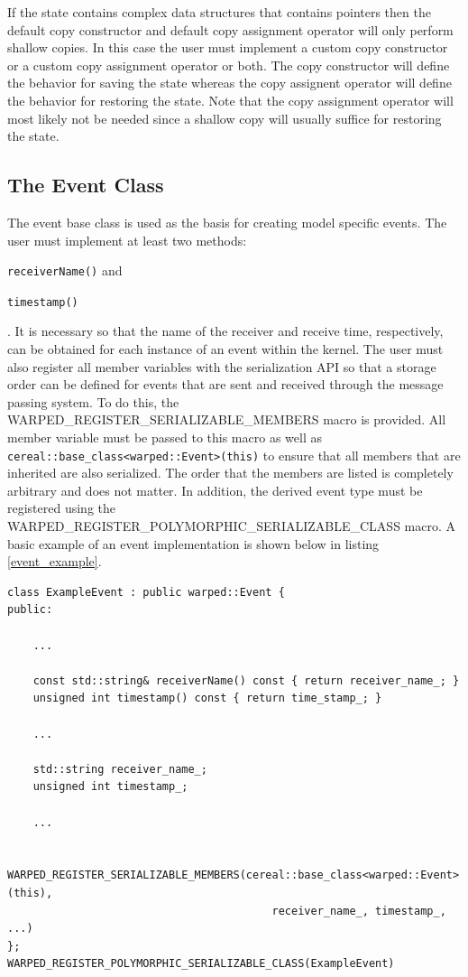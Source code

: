 \documentclass[11pt]{book}
\begin{document}
If the state contains complex data structures that contains pointers then the default copy
constructor and default copy assignment operator will only perform shallow copies. In this
case the user must implement a custom copy constructor or a custom copy assignment operator
or both. The copy constructor will define the behavior for saving the state whereas the
copy assignent operator will define the behavior for restoring the state. Note that the
copy assignment operator will most likely not be needed since a shallow copy will usually
suffice for restoring the state.

\subsection{The Event Class}

The event base class is used as the basis for creating model specific events. The user must
implement at least two methods: \begin{inparaenum}[(1)] \item \texttt{receiverName()} and 
\item \texttt{timestamp()} \end{inparaenum}. It is necessary so that the name of the receiver
and receive time, respectively, can be obtained for each instance of an event within the kernel.
The user must also register all member variables with the serialization API so that a storage
order can be defined for events that are sent and received through the message passing system.
To do this, the WARPED\_REGISTER\_SERIALIZABLE\_MEMBERS macro is provided. All member variable
must be passed to this macro as well as \texttt{cereal::base\_class<warped::Event>(this)} to
ensure that all members that are inherited are also serialized. The order that the members are
listed is completely arbitrary and does not matter. In addition, the derived event type must
be registered using the WARPED\_REGISTER\_POLYMORPHIC\_SERIALIZABLE\_CLASS macro. A basic
example of an event implementation is shown below in listing \ref{event_example}.

\begin{lstlisting}[caption=Sample \textsc{warped2} Event Definition, label=event_example, float]
class ExampleEvent : public warped::Event {
public:

    ...

    const std::string& receiverName() const { return receiver_name_; }
    unsigned int timestamp() const { return time_stamp_; }

    ...

    std::string receiver_name_;
    unsigned int timestamp_;

    ...

    WARPED_REGISTER_SERIALIZABLE_MEMBERS(cereal::base_class<warped::Event>(this),
                                         receiver_name_, timestamp_, ...)
};
WARPED_REGISTER_POLYMORPHIC_SERIALIZABLE_CLASS(ExampleEvent)
\end{lstlisting}
\end{document}
